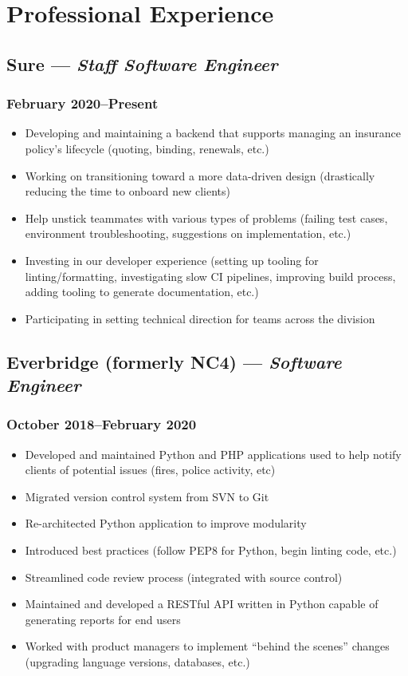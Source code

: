 \documentclass{article}
\begin{document}
\begin{minipage}[t]{.6\textwidth}
	\section*{Professional Experience}
	\subsection*{Sure  --- \textit{Staff Software Engineer}}
	\subsubsection*{February 2020--Present}
	\begin{itemize}
		\item Developing and maintaining a backend that supports managing an
		      insurance policy's lifecycle (quoting, binding, renewals, etc.)
		\item Working on transitioning toward a more data-driven design
		      (drastically reducing the time to onboard new clients)
		\item Help unstick teammates with various types of problems (failing test cases,
		      environment troubleshooting, suggestions on implementation, etc.)
		\item Investing in our developer experience (setting up tooling for
		      linting/formatting, investigating slow CI pipelines, improving
		      build
		      process, adding tooling to generate documentation, etc.)
		\item Participating in setting technical direction for teams across the
		      division
	\end{itemize}
	\subsection*{Everbridge (formerly NC4) --- \textit{Software Engineer}}
	\subsubsection*{October 2018--February 2020}
	\begin{itemize}
		\item Developed and maintained Python and PHP applications used to help notify
		      clients of potential issues (fires, police activity, etc)
		\item Migrated version control system from SVN to Git
		\item Re-architected Python application to improve modularity
		\item Introduced best practices (follow PEP8 for Python, begin linting code, etc.)
		\item Streamlined code review process (integrated with source control)
		\item Maintained and developed a RESTful API written in Python capable of generating
		      reports for end users
		\item Worked with product managers to implement ``behind the scenes'' changes
		      (upgrading language versions, databases, etc.)
	\end{itemize}

\end{minipage}
\end{document}
